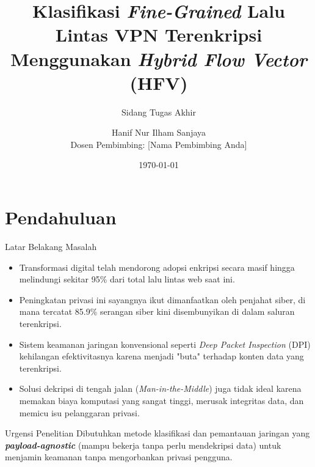 \documentclass[
  aspectratio=169,
]{beamer}
\title[Klasifikasi VPN dengan HFV]{Klasifikasi \textit{Fine-Grained} Lalu Lintas VPN Terenkripsi Menggunakan \textit{Hybrid Flow Vector} (HFV)}
\subtitle[Sidang Skripsi]{Sidang Tugas Akhir}
\author[Hanif Nur Ilham Sanjaya]{Hanif Nur Ilham Sanjaya\texorpdfstring{\\}{, }Dosen Pembimbing: [Nama Pembimbing Anda]}
\institute[Universitas]{Program Studi Teknik Komputer}
\date{\today}
\begin{document}
\begin{frame}[plain]
\maketitle
\end{frame}

\section{Pendahuluan}

\begin{frame}[shrink=5]{Latar Belakang Masalah}{}
\begin{itemize}
  \item Transformasi digital telah mendorong adopsi enkripsi secara masif hingga melindungi sekitar 95\% dari total lalu lintas web saat ini.
  \item Peningkatan privasi ini sayangnya ikut dimanfaatkan oleh penjahat siber, di mana tercatat 85.9\% serangan siber kini disembunyikan di dalam saluran terenkripsi.
  \item Sistem keamanan jaringan konvensional seperti \textit{Deep Packet Inspection} (DPI) kehilangan efektivitasnya karena menjadi "buta" terhadap konten data yang terenkripsi.
  \item Solusi dekripsi di tengah jalan (\textit{Man-in-the-Middle}) juga tidak ideal karena memakan biaya komputasi yang sangat tinggi, merusak integritas data, dan memicu isu pelanggaran privasi.
\end{itemize}

\begin{alertblock}{Urgensi Penelitian}
Dibutuhkan metode klasifikasi dan pemantauan jaringan yang \textbf{\textit{payload-agnostic}} (mampu bekerja tanpa perlu mendekripsi data) untuk menjamin keamanan tanpa mengorbankan privasi pengguna.
\end{alertblock}
\end{frame}
\end{document}
